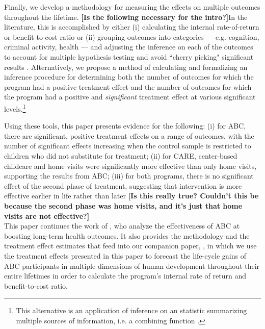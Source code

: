 Finally, we develop a methodology for measuring the effects on multiple outcomes throughout the lifetime. \textbf{[Is the following necessary for the intro?]}In the literature, this is accomplished by either (i) calculating the internal rate-of-return or benefit-to-cost ratio \citep{Heckman_Moon_etal_2010_RateofReturn}  or (ii) grouping outcomes into categories –-- e.g. cognition, criminal activity, health –-- and adjusting the inference on each of the outcomes to account for multiple hypothesis testing and avoid ``cherry picking" significant results \citep{Lehman_Romano_2005_AnnStat,Lehmann_Romano_2005_testing,Heckman_Moon_etal_2010_QE}. Alternatively, we propose a method of calculating and formalizing an inference procedure for determining both the number of outcomes for which the program had a positive treatment effect and the number of outcomes for which the program had a positive and \textit{significant} treatment effect at various significant levels.\footnote{This alternative is an application of inference on an statistic summarizing multiple sources of information, i.e. a combining function \citep{Pesarin_Salmaso_2010_PermutationTests}.}

Using these tools, this paper presents evidence for the following: (i) for ABC, there are significant, positive treatment effects on a range of outcomes, with the number of significant effects increasing when the control sample is restricted to children who did not substitute for treatment; (ii) for CARE, center-based childcare and home visits were significantly more effective than only home visits, supporting the results from ABC; (iii) for both programs, there is no significant effect of the second phase of treatment, suggesting that intervention is more effective earlier in life rather than later \textbf{[Is this really true? Couldn’t this be because the second phase was home visits, and it's just that home visits are not effective?]} \\

\noindent This paper continues the work of \citet{Campbell_Conti_etal_2014_EarlyChildhoodInvestments}, who analyze the effectiveness of ABC at boosting long-term health outcomes. It also provides the methodology and the treatment effect estimates that feed into our companion paper, \citet{Elango_et_al_2015_ABC_unpublished}, in which we use the treatment effects presented in this paper to forecast the life-cycle gains of ABC participants in multiple dimensions of human development throughout their entire lifetimes in order to calculate the program's internal rate of return and benefit-to-cost ratio.\\


